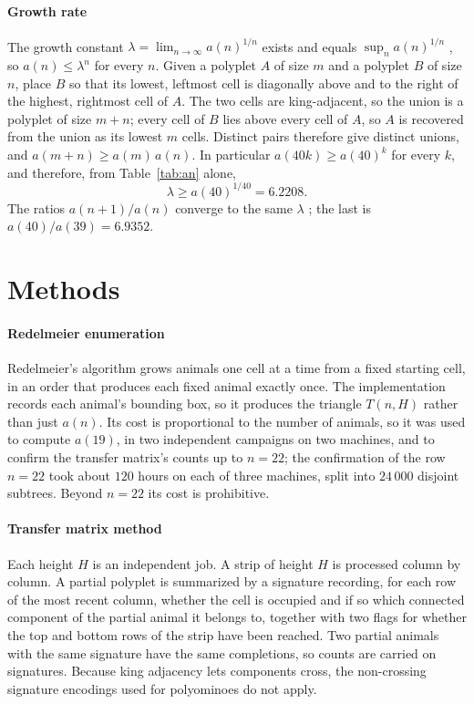 \documentclass[11pt]{article}
\begin{document}
\paragraph{Growth rate} The growth constant $\lambda = \lim_{n\to\infty}
a(n)^{1/n}$ exists and equals $\sup_n a(n)^{1/n}$ \cite{klarner1967}, so
$a(n) \le \lambda^n$ for every $n$. Given a polyplet $A$ of size $m$ and a
polyplet $B$ of size $n$, place $B$ so that its lowest, leftmost cell is
diagonally above and to the right of the highest, rightmost cell of $A$. The
two cells are king-adjacent, so the union is a polyplet of size $m+n$; every
cell of $B$ lies above every cell of $A$, so $A$ is recovered from the union
as its lowest $m$ cells. Distinct pairs therefore give distinct unions, and
$a(m+n) \ge a(m)\,a(n)$. In particular $a(40k) \ge a(40)^k$ for every $k$,
and therefore, from Table~\ref{tab:an} alone,
\[ \lambda \ge a(40)^{1/40} = 6.2208. \]
The ratios $a(n+1)/a(n)$ converge to the same $\lambda$ \cite{madras1999};
the last is $a(40)/a(39) = 6.9352$.

\section{Methods}
\label{sec:methods}

\paragraph{Redelmeier enumeration} Redelmeier's algorithm
\cite{redelmeier1981} grows animals one cell at a time from a fixed starting
cell, in an order that produces each fixed animal exactly once. The implementation records
each animal's bounding box, so it produces the triangle $T(n,H)$ rather than
just $a(n)$. Its cost is
proportional to the number of animals, so it was used to compute $a(19)$, in
two independent campaigns on two machines, and to confirm the transfer
matrix's counts up to $n = 22$; the confirmation of the row $n = 22$ took
about $120$ hours on each of three machines, split into $24\,000$ disjoint
subtrees. Beyond $n = 22$ its cost is prohibitive.

\paragraph{Transfer matrix method} Each height $H$ is an independent job. A
strip of height $H$ is processed column by column. A partial polyplet is
summarized by a signature recording, for each row of the most recent column,
whether the cell is occupied and if so which connected component of the
partial animal it belongs to, together with two flags for whether the top
and bottom rows of the strip have been reached. Two partial animals with the
same signature have the same completions, so counts are carried on
signatures. Because king adjacency lets components cross, the non-crossing
signature encodings used for polyominoes \cite{jensen2001} do not apply.
\end{document}
